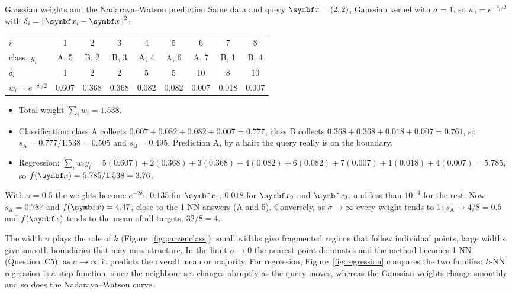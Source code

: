 \documentclass[11pt]{article}
\begin{document}
\begin{worked}{Gaussian weights and the Nadaraya--Watson prediction}
Same data and query $\x = (2,2)$, Gaussian kernel with $\sigma = 1$, so $w_i = e^{-\delta_i/2}$ with
$\delta_i = \norm{\x_i - \x}^2$:
\begin{center}\small
\begin{tabular}{@{}lcccccccc@{}}
\toprule
$i$ & 1 & 2 & 3 & 4 & 5 & 6 & 7 & 8 \\
class, $y_i$ & A, 5 & B, 2 & B, 3 & A, 4 & A, 6 & A, 7 & B, 1 & B, 4 \\
$\delta_i$ & 1 & 2 & 2 & 5 & 5 & 10 & 8 & 10 \\
$w_i = e^{-\delta_i/2}$ & 0.607 & 0.368 & 0.368 & 0.082 & 0.082 & 0.007 & 0.018 & 0.007 \\
\bottomrule
\end{tabular}
\end{center}
\begin{itemize}
\item Total weight $\sum_i w_i = 1.538$.
\item Classification: class A collects $0.607 + 0.082 + 0.082 + 0.007 = 0.777$, class B collects
$0.368 + 0.368 + 0.018 + 0.007 = 0.761$, so $s_{\mathrm{A}} = 0.777/1.538 = 0.505$ and $s_{\mathrm{B}} = 0.495$.
Prediction A, by a hair: the query really is on the boundary.
\item Regression: $\sum_i w_i y_i = 5(0.607) + 2(0.368) + 3(0.368) + 4(0.082) + 6(0.082) + 7(0.007) + 1(0.018) +
4(0.007) = 5.785$, so $f(\x) = 5.785 / 1.538 = 3.76$.
\end{itemize}
With $\sigma = 0.5$ the weights become $e^{-2\delta_i}$: $0.135$ for $\x_1$, $0.018$ for $\x_2$ and $\x_3$, and less
than $10^{-4}$ for the rest. Now $s_{\mathrm{A}} = 0.787$ and $f(\x) = 4.47$, close to the 1-NN answers (A and 5).
Conversely, as $\sigma \to \infty$ every weight tends to 1: $s_{\mathrm{A}} \to 4/8 = 0.5$ and $f(\x)$ tends to the mean
of all targets, $32/8 = 4$.
\end{worked}

The width $\sigma$ plays the role of $k$ (Figure~\ref{fig:parzenclass}): small widths give fragmented regions that
follow individual points, large widths give smooth boundaries that may miss structure. In the limit $\sigma \to 0$ the
nearest point dominates and the method becomes 1-NN (Question~C5); as $\sigma \to \infty$ it predicts the overall
mean or majority. For regression, Figure~\ref{fig:regression} compares the two families: $k$-NN regression is a
step function, since the neighbour set changes abruptly as the query moves, whereas the Gaussian weights change
smoothly and so does the Nadaraya--Watson curve.
\end{document}
